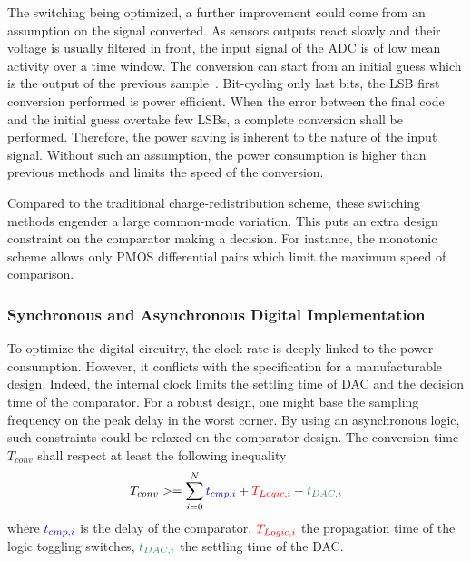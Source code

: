 The switching being optimized, a further improvement could come from an assumption on the signal converted. As sensors outputs react slowly and their voltage is usually filtered in front, the input signal of the ADC is of low mean activity over a time window. The conversion can start from an initial guess which is the output of the previous sample~\cite{Yaul2014}. Bit-cycling only last bits, the LSB first conversion performed is power efficient. When the error between the final code and the initial guess overtake few LSBs, a complete conversion shall be performed. Therefore, the power saving is inherent to the nature of the input signal. Without such an assumption, the power consumption is higher than previous methods and limits the speed of the conversion.

Compared to the traditional charge-redistribution scheme, these switching methods engender a large common-mode variation. This puts an extra design constraint on the comparator making a decision. For instance, the monotonic scheme allows only PMOS differential pairs which limit the maximum speed of comparison.

\subsubsection{Synchronous and Asynchronous Digital Implementation}
To optimize the digital circuitry, the clock rate is deeply linked to the power consumption. However, it conflicts with the specification for a manufacturable design. Indeed, the internal clock limits the settling time of DAC and the decision time of the comparator. For a robust design, one might base the sampling frequency on the peak delay in the worst corner. By using an asynchronous logic, such constraints could be relaxed on the comparator design. The conversion time \(T_{conv}  \) shall respect at least the following inequality
\begin{equation}
\label{eqn:sar_async_conv}
T_{conv} >= \sum_{i=0}^N {\textcolor{blue}{t_{cmp, i}}+\textcolor{red}{T_{Logic, i}}+\textcolor{Xgreen}{t_{DAC, i}}}
\end{equation}
where \(\textcolor{blue}{t_{cmp, i}}\) is the delay of the comparator, \(\textcolor{red}{T_{Logic, i}}\) the propagation time of the logic toggling switches, \(\textcolor{Xgreen}{t_{DAC, i}}\) the settling time of the DAC\@.

